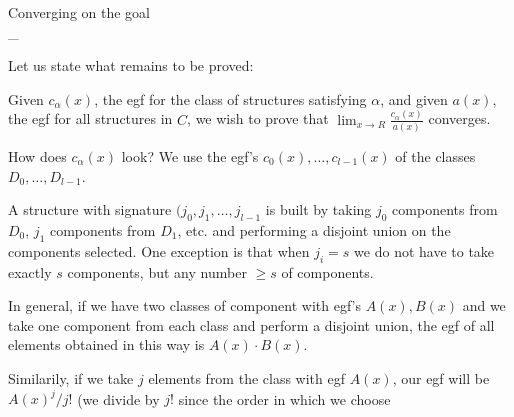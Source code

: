 \documentclass[landscape,a4]{myslides}
\begin{document}
\begin{slide}
\begin{center}
{%
\color{blue}
Converging on the goal
}
\\
\_\hrulefill
\end{center}
\small

Let us state what remains to be proved:

Given $c_\alpha(x)$, the egf for the class of structures satisfying $\alpha$, and given $a(x)$, the egf for all structures in $C$, we wish to prove that $\lim_{x\to R}\frac{c_\alpha(x)}{a(x)}$ converges.

How does $c_\alpha(x)$ look? We use the egf's $c_0(x),\dots,c_{l-1}(x)$ of the classes $D_0,\dots,D_{l-1}$.

A structure with signature $(j_0,j_1,\dots,j_{l-1}$ is built by taking $j_0$ components from $D_0$, $j_1$ components from $D_1$, etc. and performing a disjoint union on the components selected. 
One exception is that when $j_i = s$ we do not have to take exactly $s$ components, but any number $\ge s$ of components.

In general, if we have two classes of component with egf's $A(x),B(x)$ and we take one component from each class and perform a disjoint union, the egf of all
elements obtained in this way is $A(x)\cdot B(x)$.

Similarily, if we take $j$ elements from the class with egf $A(x)$, our egf will be $A(x)^j/j!$ (we divide by $j!$ since the order in which we choose 
\end{slide}
\end{document}
